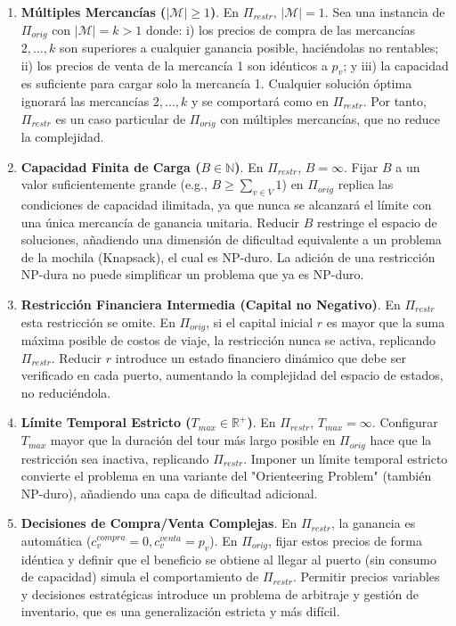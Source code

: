 \documentclass{article}
\begin{document}
\begin{enumerate}
    \item \textbf{Múltiples Mercancías ($|\mathcal{M}| \geq 1$)}. En $\Pi_{restr}$, $|\mathcal{M}|=1$. Sea una instancia de $\Pi_{orig}$ con $|\mathcal{M}|=k>1$ donde: i) los precios de compra de las mercancías $2, ..., k$ son superiores a cualquier ganancia posible, haciéndolas no rentables; ii) los precios de venta de la mercancía 1 son idénticos a $p_v$; y iii) la capacidad es suficiente para cargar solo la mercancía 1. Cualquier solución óptima ignorará las mercancías $2, ..., k$ y se comportará como en $\Pi_{restr}$. Por tanto, $\Pi_{restr}$ es un caso particular de $\Pi_{orig}$ con múltiples mercancías, que no reduce la complejidad.

    \item \textbf{Capacidad Finita de Carga ($B \in \mathbb{N}$)}. En $\Pi_{restr}$, $B = \infty$. Fijar $B$ a un valor suficientemente grande (e.g., $B \geq \sum_{v \in V} 1$) en $\Pi_{orig}$ replica las condiciones de capacidad ilimitada, ya que nunca se alcanzará el límite con una única mercancía de ganancia unitaria. Reducir $B$ restringe el espacio de soluciones, añadiendo una dimensión de dificultad equivalente a un problema de la mochila (Knapsack), el cual es NP-duro. La adición de una restricción NP-dura no puede simplificar un problema que ya es NP-duro.

    \item \textbf{Restricción Financiera Intermedia (Capital no Negativo)}. En $\Pi_{restr}$ esta restricción se omite. En $\Pi_{orig}$, si el capital inicial $r$ es mayor que la suma máxima posible de costos de viaje, la restricción nunca se activa, replicando $\Pi_{restr}$. Reducir $r$ introduce un estado financiero dinámico que debe ser verificado en cada puerto, aumentando la complejidad del espacio de estados, no reduciéndola.

    \item \textbf{Límite Temporal Estricto ($T_{max} \in \mathbb{R}^+$)}. En $\Pi_{restr}$, $T_{max} = \infty$. Configurar $T_{max}$ mayor que la duración del tour más largo posible en $\Pi_{orig}$ hace que la restricción sea inactiva, replicando $\Pi_{restr}$. Imponer un límite temporal estricto convierte el problema en una variante del "Orienteering Problem" (también NP-duro), añadiendo una capa de dificultad adicional.

    \item \textbf{Decisiones de Compra/Venta Complejas}. En $\Pi_{restr}$, la ganancia es automática ($c^{compra}_v = 0, c^{venta}_v = p_v$). En $\Pi_{orig}$, fijar estos precios de forma idéntica y definir que el beneficio se obtiene al llegar al puerto (sin consumo de capacidad) simula el comportamiento de $\Pi_{restr}$. Permitir precios variables y decisiones estratégicas introduce un problema de arbitraje y gestión de inventario, que es una generalización estricta y más difícil.
\end{enumerate}
\end{document}
